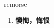 
\begin{frame}
{\huge remorse}
\begin{center}
\begin{enumerate}\Large
  \item \textbf{懊悔，悔恨}
\end{enumerate}
\end{center}
\end{frame}
